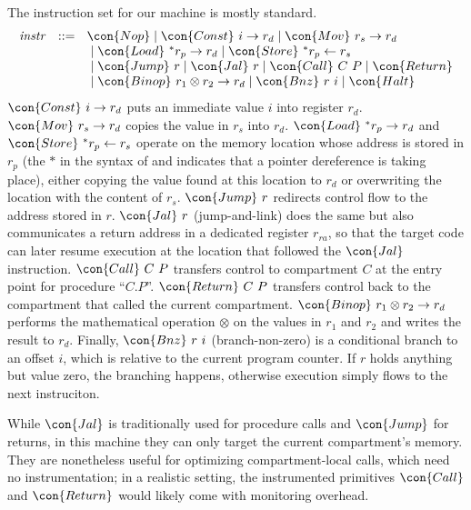 \documentclass[10pt, conference, compsocconf, letterpaper, times]{IEEEtran}
\begin{document}
The instruction set for our machine is mostly standard.
\[
  \begin{array}{l@{}l}
  \mathit{instr} \ \ \mathrel{::=}\ \ \;&
    \con{Nop}
    \;|\;
    \con{Const}~i\rightarrow{}r_d
    \;|\;
    \con{Mov}~r_s\rightarrow{}r_d
  \\ &
    \;|\;
    \con{Load}~^{*}r_p\rightarrow{}r_d
    \;|\;
    \con{Store}~^{*}r_p\leftarrow{}r_s
  \\ &
    \;|\;
    \con{Jump}~r
    \;|\;
    \con{Jal}~r
    \;|\;
    \con{Call}~C~P
    \;|\;
    \con{Return}
  \\ &
    \;|\;
    \con{Binop}~r_1\otimes{}r_2\rightarrow{}r_d
    \;|\;
    \con{Bnz}~r~i
    \;|\;
    \con{Halt}
  \end{array}
\]
$\con{Const}~i\rightarrow{}r_d$ puts an immediate value $i$ into register $r_d$.
$\con{Mov}~r_s\rightarrow{}r_d$ copies the value in $r_s$ into $r_d$.
$\con{Load}~^{*}r_p\rightarrow{}r_d$ and
$\con{Store}~^{*}r_p\leftarrow{}r_s$ operate on the memory location whose
address is stored in $r_p$ (the $*$ in the syntax of  and
 indicates that a pointer dereference is taking place), either
copying the value found at this 
location to $r_d$ or overwriting the location with the content of $r_s$.
$\con{Jump}~r$ redirects control flow to the address stored in $r$.
$\con{Jal}~r$ (jump-and-link) does the same but also communicates a
return address in a dedicated register $r_{ra}$, so that the target
code can later resume execution at the location that followed the
$\con{Jal}$ instruction.
$\con{Call}~C~P$ transfers control to compartment $C$ at the entry
point for procedure ``$C.P$''.
$\con{Return}~C~P$ transfers control back to the compartment that
called the current compartment.
$\con{Binop}~r_1\otimes{}r_2\rightarrow{}r_d$ performs the
mathematical operation $\otimes$ on the values in $r_1$ and $r_2$ and
writes the result to $r_d$.
Finally, $\con{Bnz}~r~i$ (branch-non-zero) is a conditional branch
to an offset $i$, which is relative to the current program counter.
If $r$ holds anything but value zero, the branching happens, otherwise
execution simply flows to the next instruciton.

While $\con{Jal}$ is traditionally used for procedure calls and
$\con{Jump}$ for returns, in this machine they can only target the
current compartment's memory.
They are nonetheless useful for optimizing compartment-local calls, which
need no instrumentation; in a realistic setting, the instrumented
primitives $\con{Call}$ and $\con{Return}$ would likely come with
monitoring overhead.
\end{document}
